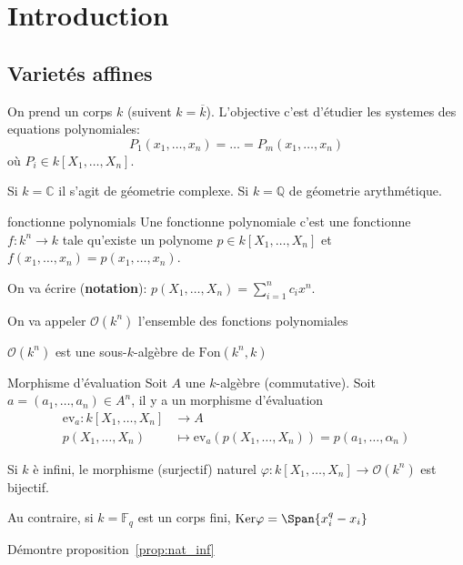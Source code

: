 \chapter{Introduction}

\section{Varietés affines}

On prend un corps \(k\) (suivent \(k = \overline{k}\)). L'objective c'est
d'étudier les systemes des equations polynomiales:
\[
  P_{1}{(x_{1}, \dots, x_{n})} = \dots = P_{m}{(x_{1}, \dots, x_{n})}
\]
où \(P_{i} \in k[X_{1}, \dots, X_{n}]\).

Si \(k = \mathbb{C}\) il s'agit de géometrie complexe. Si \(k = \mathbb{Q}\) de
géometrie arythmétique.

\begin{definition}{fonctionne polynomials}
    Une fonctionne polynomiale c'est une fonctionne \(f : k^{n} \to k\) tale
    qu'existe un polynome \(p \in k[X_{1}, \dots, X_{n}]\) et \(f{(x_{1}, \dots,
    x_{n})} = p{(x_{1}, \dots, x_{n})}\).

    On va écrire (\textbf{notation}): \(p {(X_{1}, \dots, X_{n})} =
    \sum_{i=1}^{n} c_{i} x^{n} \).

    On va appeler \(\mathcal{O}{(k^{n})}\) l'ensemble des fonctions polynomiales
\end{definition}
\begin{remark}{}
    \(\mathcal{O}{(k^{n})}\) est une sous-\(k\)-algèbre de \(\mathrm{Fon}{(k^{n}, k)}\) 
\end{remark}

\begin{definition}{Morphisme d'évaluation}
    Soit \(A\) une \(k\)-algèbre (commutative). Soit \(a = {(a_{1}, \dots,
    a_{n})} \in A^{n}\), il y a un morphisme d'évaluation
    \begin{align*}
        \mathrm{ev}_a: k[X_{1}, \dots, X_{n}] &\longrightarrow A \\
        p {(X_{1}, \dots, X_{n})} &\longmapsto   \mathrm{ev}_a(p {(X_{1}, \dots,
        X_{n})}) = p {(a_{1}, \dots, \alpha_{n})}
    \end{align*}
\end{definition}

\begin{proposition}{}\label{prop:nat_inf}
    Si \(k\) è infini, le morphisme (surjectif) naturel \(\varphi : k[X_{1},
    \dots, X_{n}] \to \mathcal{O}{(k^{n})}\) est bijectif. 

    Au contraire, si \(k = \mathbb{F}_q\) est un corps fini,
    \(\mathrm{Ker}\varphi = \Span{x_{i}^{q} - x_{i}} \) 
\end{proposition}
\begin{eser}{}
    Démontre proposition~\ref{prop:nat_inf}
\end{eser}

